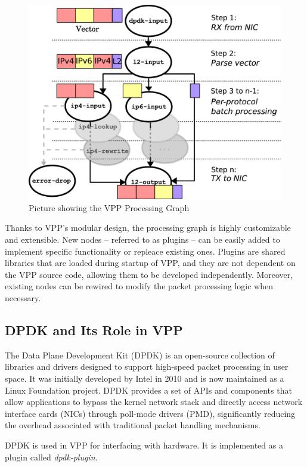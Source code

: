 \begin{figure}[!htbp]
    \centering
    \includegraphics[width=0.7\linewidth]{images/processing-graph.jpg}
    \caption{Picture showing the VPP Processing Graph~\cite{LINGUAGLOSSA}}
    \label{fig:processing-graph}
\end{figure}

Thanks to VPP's modular design, the processing graph is highly customizable and extensible. 
New nodes -- referred to as plugins -- can be easily added to implement specific functionality or repleace existing ones. 
Plugins are shared libraries that are loaded during startup of VPP, and they are not dependent on the VPP source code, allowing them to be developed independently. 
Moreover, existing nodes can be rewired to modify the packet processing logic when necessary.\cite{LINGUAGLOSSA, DR:COMMAG-18, fdio_vpp_extensible_2021}

\subsection{DPDK and Its Role in VPP}
The Data Plane Development Kit (DPDK) is an open-source collection of libraries and drivers designed to support high-speed packet processing in user space. 
It was initially developed by Intel in 2010 and is now maintained as a Linux Foundation project. 
DPDK provides a set of APIs and components that allow applications to bypass the kernel network stack and directly access network interface cards (NICs) 
through poll-mode drivers (PMD), significantly reducing the overhead associated with traditional packet handling mechanisms.\cite{dpdk_about}

DPDK is used in VPP for interfacing with hardware. It is implemented as a plugin called \textit{dpdk-plugin}.\cite{LINGUAGLOSSA, DR:COMMAG-18} 


